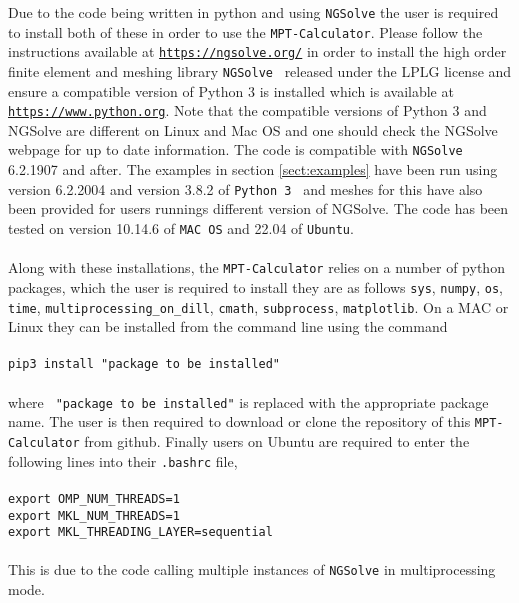 Due to the code being written in python and using \texttt{NGSolve} the user is required to install both of these in order to use the \texttt{MPT-Calculator}.  Please follow the instructions available at \href{https://ngsolve.org/}{\texttt{https://ngsolve.org/}} in order to install the high order finite element and meshing library  \texttt{NGSolve}~\cite{NGSolve,zaglmayrphd,netgendet}  released under the LPLG license and ensure a compatible version of Python 3 is installed
which is available at \href{https://www.python.org}{\texttt{https://www.python.org}}. Note that the compatible versions of Python 3 and NGSolve are different on Linux and Mac OS and one should check the NGSolve webpage for up to date information. The code is compatible with \texttt{NGSolve} 6.2.1907 and after. The examples in section \ref{sect:examples} have been run using version 6.2.2004 and version 3.8.2 of \texttt{Python 3}~\cite{python} and meshes for this have also been provided for users runnings different version of NGSolve. The code has been tested on version 10.14.6 of \texttt{MAC OS} and 22.04 of \texttt{Ubuntu}.\\
\\
\noindent
Along with these installations, the \texttt{MPT-Calculator} relies on a number of python packages, which the user is required to install they are as follows \texttt{sys}, \texttt{numpy}, \texttt{os}, \texttt{time}, \texttt{multiprocessing\_on\_dill}, \texttt{cmath}, \texttt{subprocess}, \texttt{matplotlib}. On a MAC or Linux they can be installed from the command line using the command\\
\\
\texttt{pip3 install "package to be installed"}\\
\\
where \texttt{ "package to be installed"} is replaced with the appropriate package name. The user is then required to download or clone the repository of this \texttt{MPT-Calculator} from github. Finally users on Ubuntu are required to enter the following lines into their \texttt{.bashrc} file,\\
\\
\texttt{export OMP\_NUM\_THREADS=1}\\
\texttt{export MKL\_NUM\_THREADS=1}\\
\texttt{export MKL\_THREADING\_LAYER=sequential}\\
\\
This is due to the code calling multiple instances of \texttt{NGSolve} in multiprocessing mode.


